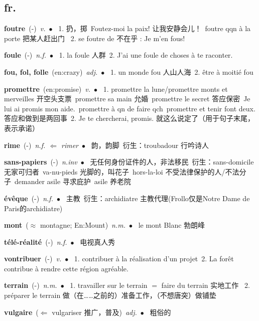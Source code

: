 \documentclass[10pt,a4paper,twoside]{article} %
\newcommand{\entry}[4]{\textbf{#1}\ {(#2)}\ \textit{#3}\ $\bullet$\ {#4}} %
\begin{document}
\begin{CJK*}{UTF8}{gkai}

\section*{fr.}

\begin{multicols}{2}



\entry{foutre}{-}{v.}
{
1. 扔，掷\ 
Foutez-moi la paix!  让我安静会儿！\ 
foutre qqn à la porte 把某人赶出门 \ 
2. se foutre de 不在乎 : Je m'en fous!
}

\entry{foule}{-}{n.f.}
{
1. la foule 人群\ 
2. J'ai une foule de choses à te raconter.
}

\entry{fou, fol, folle}{en:crazy}{adj.}
{
1. un monde fou 人山人海\ 
2. être à moitié fou
}

\entry{promettre}{en:promise}{v.}
{
1. promettre la lune/promettre monts et merveilles 开空头支票\ 
promettre sa main 允婚\ promettre le secret 答应保密\ Je lui ai promis mon aide.\ 
promettre à qn de faire qch\ promettre et tenir font deux. 答应和做到是两回事\  
2. Je te chercherai, promis. 就这么说定了（用于句子末尾，表示承诺）
}

\entry{rime}{-}{n.f. $\Leftarrow$ rimer}
{
韵，韵脚\ 
衍生：troubadour 行吟诗人
}

\entry{sans-papiers}{-}{n.inv}
{
无任何身份证件的人，非法移民\ 
衍生：sans-domicile 无家可归者\ 
va-nu-pieds 光脚的，叫花子\ 
hors-la-loi 不受法律保护的人/不法分子\ 
demander asile 寻求庇护\ 
asile 养老院\ 
}

\entry{évêque}{-}{n.f.}
{
主教\ 
衍生：archidiatre 主教代理(Frollo仅是Notre Dame de Paris的archidiatre)
}

\entry{mont}{$\approx$ montagne; En:Mount}{n.m.}
{
le mont Blanc 勃朗峰
}

\entry{télé-réalité}{-}{n.f.}
{
电视真人秀
}

\entry{vontribuer}{-}{v.}
{
1. contribuer à la réalisation d'un projet\ 
2. La forêt contribue à rendre cette région agréable. 
}

\entry{terrain}{-}{n.m.}
{
1. travailler sur le terrain $=$ faire du terrain 实地工作 \ 
2. préparer le terrain 做（在……之前的）准备工作，（不想唐突）做铺垫 
}

\entry{vulgaire}{$\Leftarrow$ vulgariser 推广，普及}{adj.}
{
粗俗的
}


\end{multicols}
\end{CJK*}
\end{document}
